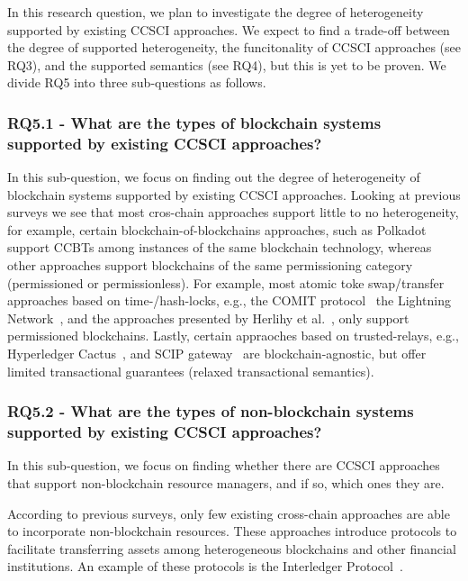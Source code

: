 \documentclass[review]{elsarticle}
\begin{document}
In this research question, we plan to investigate the degree of heterogeneity supported by existing CCSCI approaches.
We expect to find a trade-off between the degree of supported heterogeneity, the funcitonality of CCSCI approaches (see RQ3), and the supported semantics (see RQ4), but this is yet to be proven.
We divide RQ5 into three sub-questions as follows.

\subsubsection*{RQ5.1 - What are the types of blockchain systems supported by existing CCSCI approaches?}
In this sub-question, we focus on finding out the degree of heterogeneity of blockchain systems supported by existing CCSCI approaches.
Looking at previous surveys we see that most cros-chain approaches support little to no heterogeneity, for example, certain blockchain-of-blockchains approaches, such as Polkadot~\cite{Wood2016Polkadot} support CCBTs among instances of the same blockchain technology, whereas other approaches support blockchains of the same permissioning category (permissioned or permissionless).
For example, most atomic toke swap/transfer approaches based on time-/hash-locks, e.g., the COMIT protocol~\cite{CoBloX2020Comit} the Lightning Network~\cite{Poon2015LightningNetwork}, and the approaches presented by Herlihy et al.~\cite{Herlihy2018AtomicCCSwaps}, only support permissioned blockchains.
Lastly, certain appraoches based on trusted-relays, e.g., Hyperledger Cactus~\cite{Montgomery2020Cactus}, and SCIP gateway~\cite{Falazi2020_SCIP} are blockchain-agnostic, but offer limited transactional guarantees (relaxed transactional semantics).

\subsubsection*{RQ5.2 - What are the types of non-blockchain systems supported by existing CCSCI approaches?}
In this sub-question, we focus on finding whether there are CCSCI approaches that support non-blockchain resource managers, and if so, which ones they are.

According to previous surveys, only few existing cross-chain approaches are able to incorporate non-blockchain resources.
These approaches introduce protocols to facilitate transferring assets among heterogeneous blockchains and other financial institutions.
An example of these protocols is the Interledger Protocol~\cite{Hope-Bailie2016Interledger}.
\end{document}
